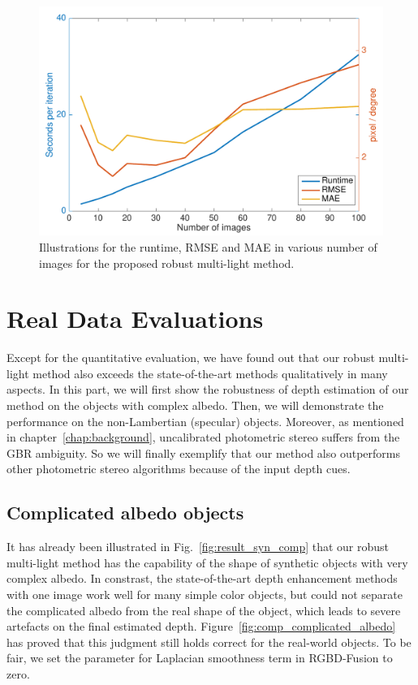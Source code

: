 \begin{figure}[!ht]
    \centering
    \includegraphics[height = 0.6\linewidth]{figures/result/runtime.pdf} 
    \caption{Illustrations for the runtime, RMSE and MAE in various number of images for the proposed robust multi-light method.}
\label{fig:result_runtime}
\end{figure}


\section{Real Data Evaluations}
Except for the quantitative evaluation, we have found out that our robust multi-light method also exceeds the state-of-the-art methods qualitatively in many aspects.
In this part, we will first show the robustness of depth estimation of our method on the objects with complex albedo.
Then, we will demonstrate the performance on the non-Lambertian (specular) objects.
Moreover, as mentioned in chapter~\ref{chap:background}, uncalibrated photometric stereo suffers from the GBR ambiguity.
So we will finally exemplify that our method also outperforms other photometric stereo algorithms because of the input depth cues.

\subsection{Complicated albedo objects}
It has already been illustrated in Fig.~\ref{fig:result_syn_comp} that our robust multi-light method has the capability of the shape of synthetic objects with very complex albedo.
In constrast, the state-of-the-art depth enhancement methods with one image work well for many simple color objects, but could not separate the complicated albedo from the real shape of the object, which leads to severe artefacts on the final estimated depth. 
Figure~\ref{fig:comp_complicated_albedo} has proved that this judgment still holds correct for the real-world objects.
To be fair, we set the parameter for Laplacian smoothness term in RGBD-Fusion to zero.

